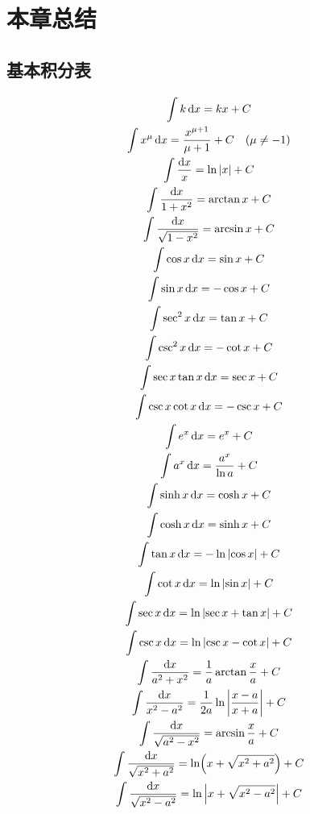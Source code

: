 \section{本章总结}
\subsection{基本积分表}
\begin{gather*}
	\int k \dd{x}
	= kx + C \\
	\int x^\mu \dd{x}
	= \frac{x^{\mu + 1}}{\mu + 1} + C \quad (\mu \neq -1) \\
	\int \frac{\dd{x}}{x}
	= \ln\abs{x} + C \\
	\int \frac{\dd{x}}{1 + x^2}
	= \arctan x + C \\
	\int \frac{\dd{x}}{\sqrt{1 - x^2}}
	= \arcsin x + C \\
	\int \cos x \dd{x}
	= \sin x + C \\
	\int \sin x \dd{x}
	= -\cos x + C \\
	\int \sec^2 x \dd{x}
	= \tan x + C \\
	\int \csc^2 x \dd{x}
	= -\cot x + C \\
	\int \sec x \tan x \dd{x}
	= \sec x + C \\
	\int \csc x \cot x \dd{x}
	= -\csc x + C \\
	\int e^x \dd{x}
	= e^x + C \\
	\int a^x \dd{x}
	= \frac{a^x}{\ln a} + C \\
	\int \sinh x \dd{x}
	= \cosh x + C \\
	\int \cosh x \dd{x}
	= \sinh x + C \\
	\int \tan x \dd{x}
	= -\ln\abs{\cos x} + C \\
	\int \cot x \dd{x}
	= \ln\abs{\sin x} + C \\
	\int \sec x \dd{x}
	= \ln\abs{\sec x + \tan x} + C \\
	\int \csc x \dd{x}
	= \ln\abs{\csc x - \cot x} + C \\
	\int \frac{\dd{x}}{a^2 + x^2}
	= \frac{1}{a} \arctan\frac{x}{a} + C \\
	\int \frac{\dd{x}}{x^2 - a^2}
	= \frac{1}{2a} \ln\abs{\frac{x - a}{x + a}} + C \\
	\int \frac{\dd{x}}{\sqrt{a^2 - x^2}}
	= \arcsin\frac{x}{a} + C \\
	\int \frac{\dd{x}}{\sqrt{x^2 + a^2}}
	= \ln(x + \sqrt{x^2 + a^2}) + C \\
	\int \frac{\dd{x}}{\sqrt{x^2 - a^2}}
	= \ln\abs{x + \sqrt{x^2 - a^2}} + C
\end{gather*}

